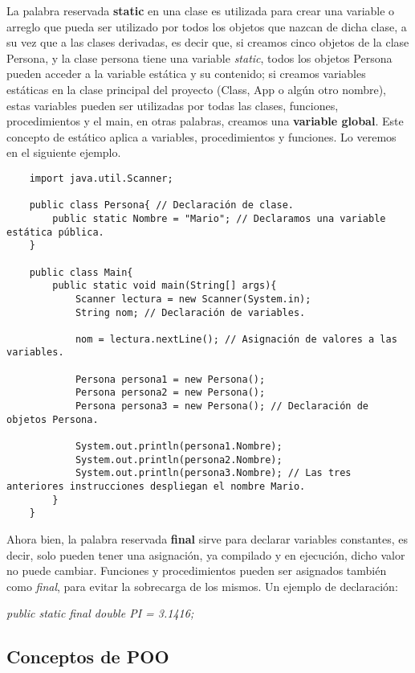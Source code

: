 La palabra reservada \textbf{static} en una clase es utilizada para crear una variable o arreglo que pueda ser utilizado por todos los objetos que nazcan de dicha clase, a su vez que a las clases derivadas, es decir que, si creamos cinco objetos de la clase Persona, y la clase persona tiene una variable \textit{static}, todos los objetos Persona pueden acceder a la variable estática y su contenido; si creamos variables estáticas en la clase principal del proyecto (Class, App o algún otro nombre), estas variables pueden ser utilizadas por todas las clases, funciones, procedimientos y el main, en otras palabras, creamos una \textbf{variable global}. Este concepto de estático aplica a variables, procedimientos y funciones. Lo veremos en el siguiente ejemplo.
\begin{lstlisting}
    import java.util.Scanner;
    
    public class Persona{ // Declaración de clase.
        public static Nombre = "Mario"; // Declaramos una variable estática pública.
    }
    
    public class Main{
        public static void main(String[] args){
            Scanner lectura = new Scanner(System.in);
            String nom; // Declaración de variables.
            
            nom = lectura.nextLine(); // Asignación de valores a las variables.
            
            Persona persona1 = new Persona();
            Persona persona2 = new Persona();
            Persona persona3 = new Persona(); // Declaración de objetos Persona.
            
            System.out.println(persona1.Nombre);
            System.out.println(persona2.Nombre);
            System.out.println(persona3.Nombre); // Las tres anteriores instrucciones despliegan el nombre Mario.
        }
    }
\end{lstlisting}

Ahora bien, la palabra reservada \textbf{final} sirve para declarar variables constantes, es decir, solo pueden tener una asignación, ya compilado y en ejecución, dicho valor no puede cambiar. Funciones y procedimientos pueden ser asignados también como \textit{final}, para evitar la sobrecarga de los mismos. Un ejemplo de declaración:
\begin{center}
    \textit{public static final double PI = 3.1416;}
\end{center}


\subsection{Conceptos de POO}


